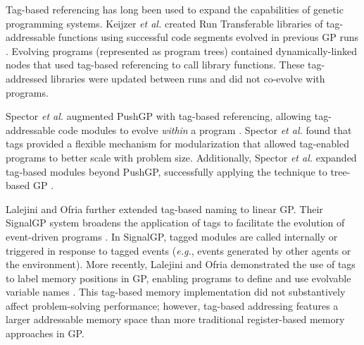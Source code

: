 Tag-based referencing has long been used to expand the capabilities of genetic programming systems.
Keijzer \textit{et al.} created Run Transferable libraries of tag-addressable functions using successful code segments evolved in previous GP runs \citep{keijzer_run_2004,keijzer_undirected_2005}.
Evolving programs (represented as program trees) contained dynamically-linked nodes that used tag-based referencing to call library functions.
These tag-addressed libraries were updated between runs and did not co-evolve with programs.

Spector \textit{et al.} augmented PushGP with tag-based referencing, allowing tag-addressable code modules to evolve \textit{within} a program \citep{spector_tag-based_2011}.
Spector \textit{et al.} found that tags provided a flexible mechanism for modularization that allowed tag-enabled programs to better scale with problem size. 
Additionally, Spector \textit{et al.} expanded tag-based modules beyond PushGP, successfully applying the technique to tree-based GP \citep{spector_tag-based_2012}.

Lalejini and Ofria further extended tag-based naming to linear GP.  
Their SignalGP system broadens the application of tags to facilitate the evolution of event-driven programs \citep{lalejini_evolving_2018,lalejini_what_2019}. 
In SignalGP, tagged modules are called internally or triggered in response to tagged events (\textit{e.g.}, events generated by other agents or the environment).
More recently, Lalejini and Ofria demonstrated the use of tags to label memory positions in GP, enabling programs to define and use evolvable variable names \citep{lalejini_tag-accessed_2019}.
This tag-based memory implementation did not substantively affect problem-solving performance; however, tag-based addressing features a larger addressable memory space than more traditional register-based memory approaches in GP.

